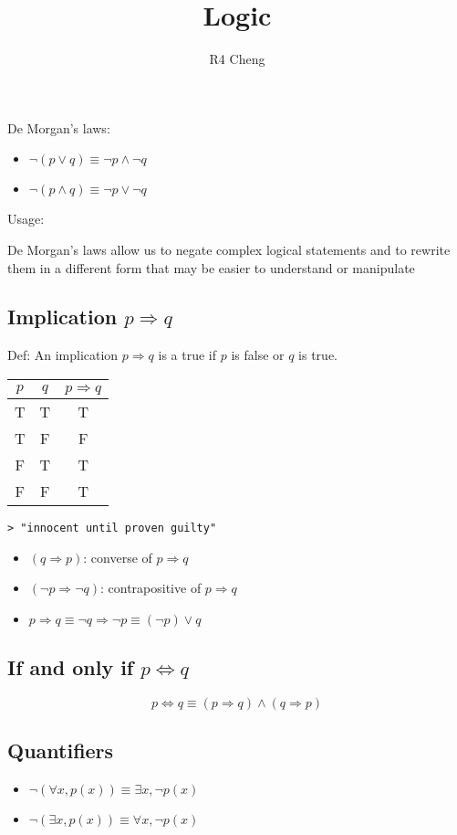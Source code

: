 \documentclass[12pt,a4paper]{article}
\title{Logic}
\author{R4 Cheng}
\date{}
\begin{document}
\maketitle

De Morgan's laws:
\begin{itemize}
  \item $\neg (p \lor q) \equiv \neg p \land \neg q $
  \item $\neg (p \land q) \equiv \neg p \lor \neg q $
\end{itemize}

Usage:

De Morgan's laws allow us to negate complex logical statements and to rewrite them in a different form that may be easier to understand or manipulate

\subsection*{Implication $p \Rightarrow q$}
Def: An implication $p \Rightarrow q$ is a true if $p$ is false or $q$ is true.

\begin{tabular}{|c|c|c|}
\hline
$p$ & $q$ & $p \Rightarrow q$ \\
\hline
T & T & T \\
T & F & F \\
F & T & T \\
F & F & T \\
\hline
\end{tabular}

\texttt{> "innocent until proven guilty" }

\begin{itemize}
  \item $(q \Rightarrow p)$: converse of $p \Rightarrow q$
  \item $(\neg p \Rightarrow \neg q)$: contrapositive of $p \Rightarrow q$
  \item $p \Rightarrow q \equiv \neg q \Rightarrow \neg p \equiv (\neg p) \lor q $
\end{itemize}

\subsection*{If and only if $p \Leftrightarrow q$}

$$ p \Leftrightarrow q \equiv (p \Rightarrow q) \land (q \Rightarrow p) $$

\subsection*{Quantifiers}

\begin{itemize}
  \item $\neg (\forall x, p(x)) \equiv \exists x, \neg p(x) $
  \item $\neg (\exists x, p(x)) \equiv \forall x, \neg p(x) $
\end{itemize}
\end{document}
